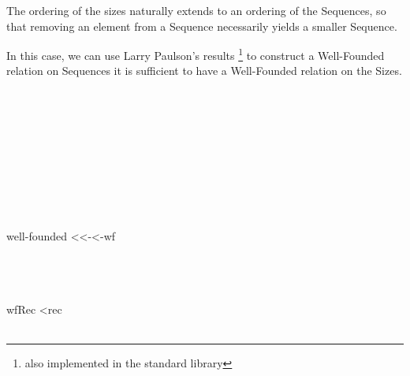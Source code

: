 \documentclass[12pt,twoside,notitlepage]{report}
\begin{document}
The ordering of the sizes naturally extends to an ordering of the Sequences, so that removing an element from a Sequence necessarily yields a smaller Sequence.

In this case, we can use Larry Paulson's results \footnote{also implemented in the standard library} to construct a Well-Founded relation on Sequences it is sufficient to have a Well-Founded relation on the Sizes.

\begin{code} 
\\
\>[4]\<[6]%
\>[6]\<%
\\
\>[4]\<[6]%
\>[6] \AgdaSymbol{:}  \AgdaSymbol{\{}\AgdaSymbol{\}} \AgdaSymbol{\{} \AgdaSymbol{:}  \AgdaSymbol{\}}         \<%
\\
\>[4]\<[6]%
\>[6] \AgdaSymbol{=} \AgdaDatatype{\_<<\_}  \<%
\\
%
\\
\>[4]\<[6]%
\>[6] \<%
\\
\>[6]\<[8]%
\>[8]\AgdaSymbol{\{} \AgdaSymbol{=}  \AgdaSymbol{\}}\<%
\\
\>[6]\<[8]%
\>[8]\AgdaSymbol{\{}\AgdaArgument{\_<\_} \AgdaSymbol{=} \AgdaDatatype{\_<<\_}\AgdaSymbol{\}}\<%
\\
\>[6]\<[8]%
\>[8]\<%
\\
\>[6]\<[8]%
\>[8] \AgdaSymbol{(}well-founded  <<-<-wf\AgdaSymbol{)}\<%
\\
\end{code}


\begin{code}
%
\\
\>[0]\<[4]%
\>[4]\<%
\\
\>[4]\<[6]%
\>[6] \AgdaSymbol{=}  \<%
\\
\>[4]\<[6]%
\>[6]  \AgdaSymbol{(}\AgdaSymbol{)}  \AgdaSymbol{(}wfRec  <rec\AgdaSymbol{)}\<%
\\
%
\\
\end{code}
\end{document}
